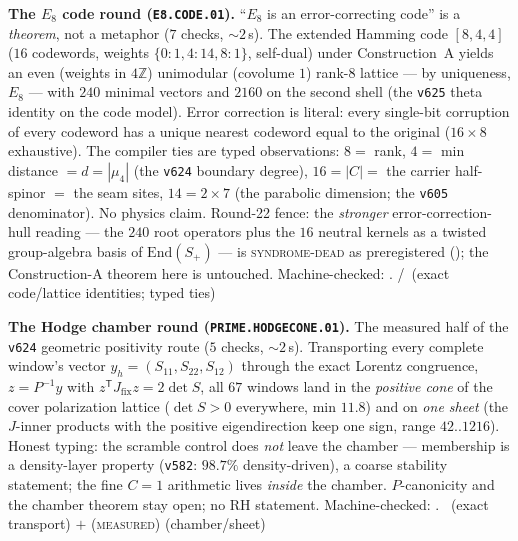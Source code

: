 \documentclass[11pt,a4paper]{article}
\theoremstyle{definition}
\begin{document}
\par\smallskip\noindent\textbf{The $E_8$ code round
(\texttt{E8.CODE.01}).}
``$E_8$ is an error-correcting code'' is a \emph{theorem}, not a
metaphor ($7$ checks, ${\sim}2$\,s).  The extended Hamming code
$[8,4,4]$ ($16$ codewords, weights $\{0{:}1,4{:}14,8{:}1\}$, self-dual)
under Construction~A yields an even (weights in $4\mathbb Z$)
unimodular (covolume $1$) rank-$8$ lattice --- by uniqueness, $E_8$ ---
with $240$ minimal vectors and $2160$ on the second shell (the
\texttt{v625} theta identity on the code model).  Error correction is
literal: every single-bit corruption of every codeword has a unique
nearest codeword equal to the original ($16\times8$ exhaustive).  The
compiler ties are typed observations: $8=$ rank, $4=$ min distance
$=d=|\mu_4|$ (the \texttt{v624} boundary degree), $16=|C|=$ the carrier
half-spinor $=$ the seam sites, $14=2\times7$ (the parabolic dimension;
the \texttt{v605} denominator).  No physics claim.  Round-22 fence:
the \emph{stronger} error-correction-hull reading --- the $240$ root
operators plus the $16$ neutral kernels as a twisted group-algebra
basis of $\mathrm{End}(S_+)$ --- is \textsc{syndrome-dead} as
preregistered (); the
Construction-A theorem here is untouched.
Machine-checked: .
\mE/\mC\ (exact code/lattice identities; typed ties)
\par\smallskip

\par\smallskip\noindent\textbf{The Hodge chamber round
(\texttt{PRIME.HODGECONE.01}).}
The measured half of the \texttt{v624} geometric positivity route
($5$ checks, ${\sim}2$\,s).  Transporting every complete window's
vector $y_h=(S_{11},S_{22},S_{12})$ through the exact Lorentz
congruence, $z=P^{-1}y$ with $z^{\mathsf T}J_{\mathrm{fix}}z=2\det S$,
all $67$ windows land in the \emph{positive cone} of the cover
polarization lattice ($\det S>0$ everywhere, min $11.8$) and on
\emph{one sheet} (the $J$-inner products with the positive
eigendirection keep one sign, range $42..1216$).  Honest typing: the
scramble control does \emph{not} leave the chamber --- membership is a
density-layer property (\texttt{v582}: $98.7\%$ density-driven), a
coarse stability statement; the fine $C=1$ arithmetic lives
\emph{inside} the chamber.  $P$-canonicity and the chamber theorem
stay open; no RH statement.
Machine-checked: .
\mE\ (exact transport) $+$ (\textsc{measured}) (chamber/sheet)
\par\smallskip
\end{document}
